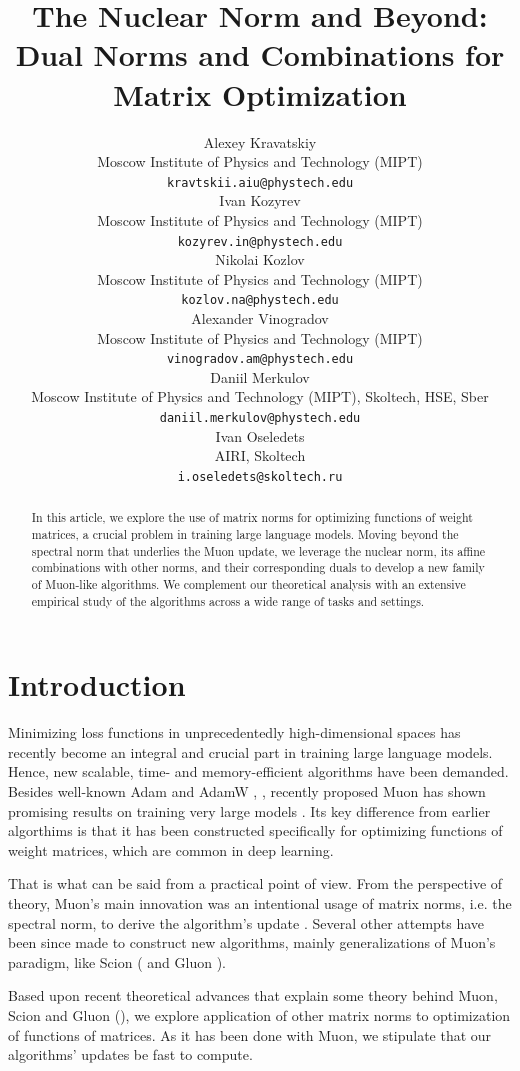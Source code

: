 \documentclass{article} %
\title{The Nuclear Norm and Beyond: Dual Norms and Combinations for Matrix Optimization}
\author{Alexey Kravatskiy \\
Moscow Institute of Physics and Technology (MIPT) \\
\texttt{kravtskii.aiu@phystech.edu} \\
\And
Ivan Kozyrev \\
Moscow Institute of Physics and Technology (MIPT) \\
\texttt{kozyrev.in@phystech.edu} \\
\And
Nikolai Kozlov \\
Moscow Institute of Physics and Technology (MIPT) \\
\texttt{kozlov.na@phystech.edu} \\
\And
Alexander Vinogradov \\
Moscow Institute of Physics and Technology (MIPT) \\
\texttt{vinogradov.am@phystech.edu} \\
\And
Daniil Merkulov \\
Moscow Institute of Physics and Technology (MIPT), Skoltech, HSE, Sber \\
\texttt{daniil.merkulov@phystech.edu} \\
\And
Ivan Oseledets \\
AIRI, Skoltech \\
\texttt{i.oseledets@skoltech.ru}
}
\begin{document}
\maketitle

\begin{abstract}
In this article, we explore the use of matrix norms for optimizing functions of weight matrices, a crucial problem in training large language models. Moving beyond the spectral norm that underlies the Muon update, we leverage the nuclear norm, its affine combinations with other norms, and their corresponding duals to develop a new family of Muon-like algorithms. We complement our theoretical analysis with an extensive empirical study of the algorithms across a wide range of tasks and settings.
\end{abstract}


\section{Introduction}
 Minimizing loss functions in unprecedentedly high-dimensional spaces has recently become an integral and crucial part in training large language models. Hence, new scalable, time- and memory-efficient algorithms have been demanded. Besides well-known Adam and AdamW \cite{kingma2014adam}, \cite{loshchilov2017decoupled}, recently proposed Muon has shown promising results on training very large models \cite{jordan2024muon,ahn2025dioncommunicationefficientoptimizerlarge}. Its key difference from earlier algorthims is that it has been constructed specifically for optimizing functions of weight matrices, which are common in deep learning.

 That is what can be said from a practical point of view. From the perspective of theory, Muon's main innovation was an intentional usage of matrix norms, i.e. the spectral norm, to derive the algorithm's update \cite{bernstein2025deriving}. Several other attempts have been since made to construct new algorithms, mainly generalizations of Muon's paradigm, like Scion (\cite{pethick2025training} and Gluon \cite{riabinin2025gluon}).

 Based upon recent theoretical advances that explain some theory behind Muon, Scion and Gluon (\cite{bernstein2025deriving,kovalev2025understanding,pethick2025training,riabinin2025gluon}), we explore application of other matrix norms to optimization of functions of matrices. As it has been done with Muon, we stipulate that our algorithms' updates be fast to compute.
\end{document}
